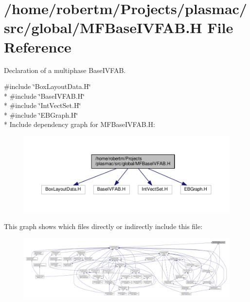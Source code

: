 \hypertarget{MFBaseIVFAB_8H}{}\section{/home/robertm/\+Projects/plasmac/src/global/\+M\+F\+Base\+I\+V\+F\+AB.H File Reference}
\label{MFBaseIVFAB_8H}


Declaration of a multiphase Base\+I\+V\+F\+AB.  


{\ttfamily \#include \char`\"{}Box\+Layout\+Data.\+H\char`\"{}}\\*
{\ttfamily \#include \char`\"{}Base\+I\+V\+F\+A\+B.\+H\char`\"{}}\\*
{\ttfamily \#include \char`\"{}Int\+Vect\+Set.\+H\char`\"{}}\\*
{\ttfamily \#include \char`\"{}E\+B\+Graph.\+H\char`\"{}}\\*
Include dependency graph for M\+F\+Base\+I\+V\+F\+A\+B.\+H\+:\nopagebreak
\begin{figure}[H]
\begin{center}
\leavevmode
\includegraphics[width=350pt]{MFBaseIVFAB_8H__incl}
\end{center}
\end{figure}
This graph shows which files directly or indirectly include this file\+:\nopagebreak
\begin{figure}[H]
\begin{center}
\leavevmode
\includegraphics[width=350pt]{MFBaseIVFAB_8H__dep__incl}
\end{center}
\end{figure}
